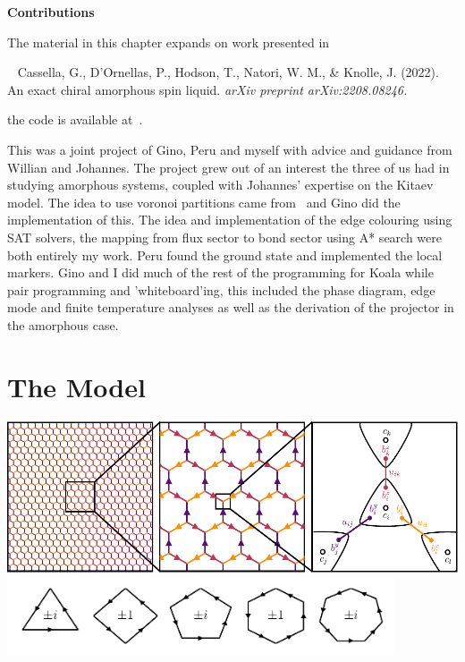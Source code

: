 \textbf{Contributions}

The material in this chapter expands on work presented in

~\autocite{cassellaExactChiralAmorphous2022} Cassella, G., D'Ornellas, P., Hodson, T., Natori, W. M., \& Knolle, J. (2022). An exact chiral amorphous spin liquid. \emph{arXiv preprint arXiv:2208.08246.}

the code is available at~\autocite{hodsonKoalaKitaevAmorphous2022}.

This was a joint project of Gino, Peru and myself with advice and guidance from Willian and Johannes. The project grew out of an interest the three of us had in studying amorphous systems, coupled with Johannes' expertise on the Kitaev model. The idea to use voronoi partitions came from~\autocite{marsalTopologicalWeaireThorpe2020} and Gino did the implementation of this. The idea and implementation of the edge colouring using SAT solvers, the mapping from flux sector to bond sector using A* search were both entirely my work. Peru found the ground state and implemented the local markers. Gino and I did much of the rest of the programming for Koala while pair programming and 'whiteboard'ing, this included the phase diagram, edge mode and finite temperature analyses as well as the derivation of the projector in the amorphous case.

\hypertarget{amk-Model}{%
\section{The Model}\label{amk-Model}}

\includegraphics[width=1\textwidth,height=\textheight]{figure_code/amk_chapter/intro/honeycomb_zoom/intro_figure_by_hand} \includegraphics[width=0.86\textwidth,height=\textheight]{figure_code/amk_chapter/intro/regular_plaquettes/regular_plaquettes}

